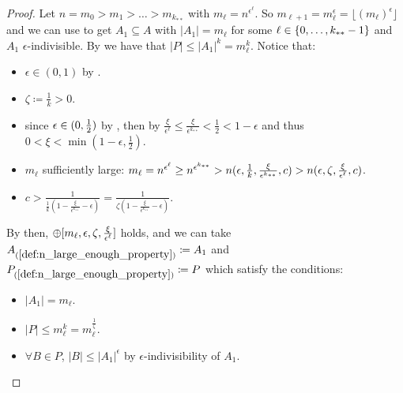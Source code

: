 \begin{lemma}[Claim 4.21]
\begin{proof}
            Let $n = m_0 > m_1 > \dots > m_{k_{**}}$ with $m_\ell = n^{\epsilon^{\ell}}$.
            So $m_{\ell+1} = m_\ell^\epsilon = \lfloor (m_\ell)^\epsilon \rfloor$ and we can use 
            to get $A_1 \subseteq A$ with $|A_1| = m_\ell$ for some $\ell \in \{ 0, \dots, k_{**}-1 \}$ and $A_1$ $\epsilon$-indivisible.
            By  we have that $|P| \leq |A_1|^k = m_\ell^k$.
            Notice that:
            \begin{itemize}
                \item $\epsilon \in (0,1)$ by .
                \item $\zeta \coloneqq \frac{1}{k} > 0$.
                \item since $\epsilon \in ( 0, \frac{1}{2} )$ by ,
                    then by 
                    $\frac{\xi}{\epsilon^\ell} \leq \frac{\xi}{\epsilon^{k_{**}}} < \frac{1}{2} < 1 - \epsilon$ and
                    thus $0 < \xi < \min(1-\epsilon, \frac{1}{2})$.
                \item $m_\ell$ sufficiently large: $m_\ell = n^{\epsilon^\ell} \geq n^{\epsilon^{k_{**}}} > n( \epsilon, \frac{1}{k},
                    \frac{\xi}{\epsilon^{k_{**}}}, c ) > n( \epsilon, \zeta, \frac{\xi}{\epsilon^{\ell}}, c )$.
                \item $c > \frac{1}{\frac{1}{k} (1 - \frac{\xi}{\epsilon^{k_{**}}} - \epsilon)}
                    = \frac{1}{\zeta (1 - \frac{\xi}{\epsilon^{k_{**}}} - \epsilon)}$.
            \end{itemize}
            By  then, $\oplus[ m_\ell, \epsilon, \zeta, \frac{\xi}{\epsilon^\ell} ]$
            holds, and we can take $A_{(\ref{def:n_large_enough_property})} \coloneqq A_1$ and
            $P_{(\ref{def:n_large_enough_property})} \coloneqq P$ which satisfy the conditions:
            \begin{itemize}
                \item $|A_1| = m_\ell$.
                \item $|P| \leq m_\ell^k = m_\ell^{\frac{1}{\zeta}}$.
                \item $\forall B \in P$, $|B| \leq |A_1|^\epsilon$ by $\epsilon$-indivisibility of $A_1$.

\end{itemize}
\end{proof}
\end{lemma}

